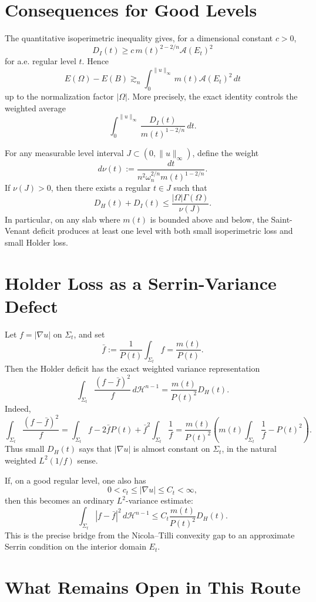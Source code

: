\documentclass[11pt]{article}
\begin{document}
\section{Consequences for Good Levels}

The quantitative isoperimetric inequality gives, for a dimensional constant
\(c>0\),
\[
D_I(t)
\ge
c\,m(t)^{2-2/n}\mathcal A(E_t)^2
\]
for a.e. regular level \(t\). Hence
\[
E(\Omega)-E(B)
\gtrsim_n
\int_0^{\|u\|_\infty}
m(t)\mathcal A(E_t)^2\,dt
\]
up to the normalization factor \(|\Omega|\). More precisely, the exact identity
controls the weighted average
\[
\int_0^{\|u\|_\infty}
\frac{D_I(t)}
{m(t)^{1-2/n}}\,dt.
\]

For any measurable level interval \(J\subset(0,\|u\|_\infty)\), define the
weight
\[
d\nu(t)
:=
\frac{dt}{n^2\omega_n^{2/n}m(t)^{1-2/n}}.
\]
If \(\nu(J)>0\), then there exists a regular \(t\in J\) such that
\[
D_H(t)+D_I(t)
\le
\frac{|\Omega|\Gamma(\Omega)}{\nu(J)}.
\]
In particular, on any slab where \(m(t)\) is bounded above and below, the
Saint-Venant deficit produces at least one level with both small isoperimetric
loss and small Holder loss.

\section{Holder Loss as a Serrin-Variance Defect}

Let \(f=|\nabla u|\) on \(\Sigma_t\), and set
\[
\bar f:=\frac1{P(t)}\int_{\Sigma_t}f
=
\frac{m(t)}{P(t)}.
\]
Then the Holder deficit has the exact weighted variance representation
\[
\boxed{
\int_{\Sigma_t}
\frac{(f-\bar f)^2}{f}\,d\mathcal H^{n-1}
=
\frac{m(t)}{P(t)^2}D_H(t).
}
\]
Indeed,
\[
\int_{\Sigma_t}\frac{(f-\bar f)^2}{f}
=
\int_{\Sigma_t}f
-2\bar f P(t)
+\bar f^2\int_{\Sigma_t}\frac1f
=
\frac{m(t)}{P(t)^2}
\left(
m(t)\int_{\Sigma_t}\frac1f-P(t)^2
\right).
\]
Thus small \(D_H(t)\) says that \(|\nabla u|\) is almost constant on
\(\Sigma_t\), in the natural weighted \(L^2(1/f)\) sense.

If, on a good regular level, one also has
\[
0<c_t\le |\nabla u|\le C_t<\infty,
\]
then this becomes an ordinary \(L^2\)-variance estimate:
\[
\int_{\Sigma_t}|f-\bar f|^2\,d\mathcal H^{n-1}
\le
C_t\frac{m(t)}{P(t)^2}D_H(t).
\]
This is the precise bridge from the Nicola--Tilli convexity gap to an
approximate Serrin condition on the interior domain \(E_t\).

\section{What Remains Open in This Route}
\end{document}
